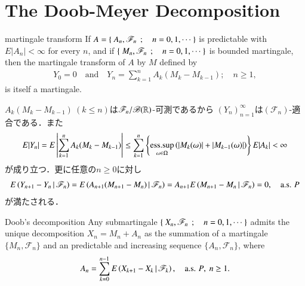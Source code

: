 \section{The Doob-Meyer Decomposition}
	\begin{itembox}[l]{martingale transform}
		If $A = \left\{\ A_n,\mathscr{F}_n\ \, ; \quad n=0,1,\cdots\ \right\}$ is predictable with $E|A_n|<\infty$ for every $n$,
		and if $\left\{\ M_n,\mathscr{F}_n\ \, ; \quad n=0,1,\cdots\ \right\}$ is bounded martingale, then the martingale transform of $A$
		by $M$ defined by
		\begin{align}
			Y_0 = 0 \quad \mbox{and} \quad
			Y_n = \sum_{k=1}^n A_k (M_k - M_{k-1});
			\quad n \geq 1, 
		\end{align}
		is itself a martingale.
	\end{itembox}
	
	\begin{prf}
		$A_k(M_k - M_{k-1})\ (k \leq n)$は$\mathscr{F}_n/\mathscr{B}(\mathbb{R})$-可測であるから
		$(Y_n)_{n=1}^\infty$は$(\mathscr{F}_n)$-適合である．また
		\begin{align}
			E|Y_n| = E\left| \sum_{k=1}^n A_k (M_k - M_{k-1}) \right|
			\leq \sum_{k=1}^n \left\{\operatorname*{ess\mbox{.}sup}_{\omega \in \Omega} \left(|M_k(\omega)|+|M_{k-1}(\omega)|\right)\right\} E|A_k| < \infty
		\end{align}
		が成り立つ．更に任意の$n \geq 0$に対し
		\begin{align}
			E\left( Y_{n+1} - Y_n \, \middle|\, \mathscr{F}_n \right)
			= E\left( A_{n+1}(M_{n+1} - M_n) \, \middle|\, \mathscr{F}_n \right)
			= A_{n+1}E\left( M_{n+1} - M_n \, \middle|\, \mathscr{F}_n \right)
			= 0,
			\quad \mbox{a.s. $P$}
		\end{align}
		が満たされる．
		\QED
	\end{prf}
	
	\begin{itembox}[l]{Doob's decomposition}\label{lem:Doob_decomposition}
		Any submartingale $\left\{\ X_n,\mathscr{F}_n\ \, ; \quad n=0,1,\cdots\ \right\}$ admits the unique decomposition
		$X_n = M_n + A_n$ as the summation of a martingale $\{M_n,\mathscr{F}_n\}$ and an 
		predictable and increasing sequence $\{A_n,\mathscr{F}_n\}$, where
		\begin{align}
			A_n = \sum_{k=0}^{n-1}E\left( X_{k+1}-X_k \, \middle|\, \mathscr{F}_k \right),
			\quad \mbox{a.s. $P$},\ n \geq 1.
		\end{align}
	\end{itembox}
	
